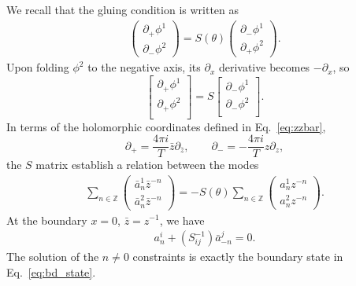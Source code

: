 We recall that the gluing condition is written as
\begin{equation}
\begin{aligned}
\label{eq:def_S_in_app}
\begin{pmatrix}
\partial_+\phi^1\\
\partial_-\phi^2
\end{pmatrix}
=S(\theta)
\begin{pmatrix}
\partial_-\phi^1\\
\partial_+\phi^2
\end{pmatrix}.
\end{aligned}
\end{equation}
Upon folding $\phi^2$ to the negative axis, its $\partial_x$ derivative becomes $-\partial_x$, so 
\begin{equation}
\begin{bmatrix}
\partial_{+} \phi^1 \\
\partial_{+} \phi^2 \\
\end{bmatrix}
 = S
\begin{bmatrix}
\partial_{-} \phi^1 \\
\partial_{-} \phi^2 \\
\end{bmatrix}.
\end{equation}
In terms of the holomorphic coordinates defined in Eq.~\eqref{eq:zzbar}, 
\begin{equation}
\partial_{+} = \frac{4\pi i }{T} \bar{z} \partial_{\bar{z}} ,\qquad \partial_{-} = -\frac{4\pi i }{T} z\partial_{z},
\end{equation}
the $S$ matrix establish a relation between the modes
\begin{equation}
\begin{aligned}
\label{eq:def_S_in_app_2}
\sum_{n\in\mathbb{Z}}
\begin{pmatrix}
\bar{a}_n^1\bar{z}^{-n}\\
\bar{a}_n^2\bar{z}^{-n}
\end{pmatrix}
= -S(\theta)
\sum_{n\in\mathbb{Z}}
\begin{pmatrix}
a_n^1{z}^{-n}\\
a_n^2{z}^{-n}
\end{pmatrix}.
\end{aligned}
\end{equation}
At the boundary $x = 0$, $\bar{z}=z^{-1}$, we have
\begin{equation}
\begin{aligned}
a^i_n + (S^{-1}_{ij})\bar{a}^j_{-n}=0.
\end{aligned}
\end{equation}
The solution of the $n \ne 0$ constraints is exactly the boundary state in Eq.~\eqref{eq:bd_state}. 


